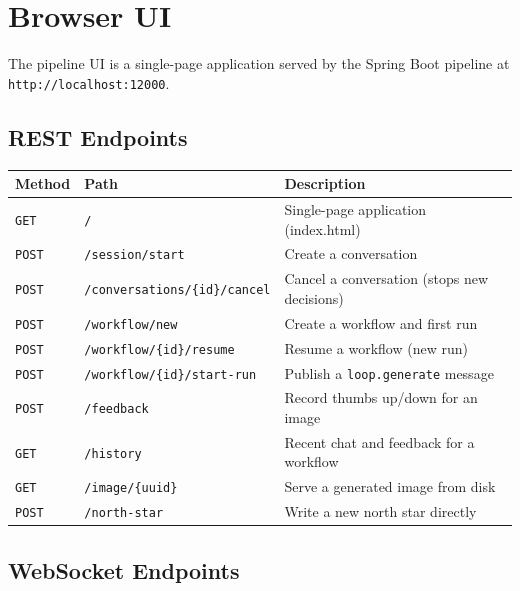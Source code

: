 \documentclass[11pt,letterpaper]{article}
\begin{document}
\section{Browser UI}
\label{sec:ui}

The pipeline UI is a single-page application served by the Spring Boot
pipeline at \texttt{http://localhost:12000}.

\subsection{REST Endpoints}

\begin{center}
\begin{tabular}{lll}
\toprule
\textbf{Method} & \textbf{Path} & \textbf{Description} \\
\midrule
\texttt{GET}  & \texttt{/}                                    & Single-page application (index.html) \\
\texttt{POST} & \texttt{/session/start}                        & Create a conversation \\
\texttt{POST} & \texttt{/conversations/\{id\}/cancel}          & Cancel a conversation (stops new decisions) \\
\texttt{POST} & \texttt{/workflow/new}                         & Create a workflow and first run \\
\texttt{POST} & \texttt{/workflow/\{id\}/resume}      & Resume a workflow (new run) \\
\texttt{POST} & \texttt{/workflow/\{id\}/start-run}   & Publish a \texttt{loop.generate} message \\
\texttt{POST} & \texttt{/feedback}                    & Record thumbs up/down for an image \\
\texttt{GET}  & \texttt{/history}                     & Recent chat and feedback for a workflow \\
\texttt{GET}  & \texttt{/image/\{uuid\}}              & Serve a generated image from disk \\
\texttt{POST} & \texttt{/north-star}                  & Write a new north star directly \\
\bottomrule
\end{tabular}
\end{center}

\subsection{WebSocket Endpoints}
\end{document}
